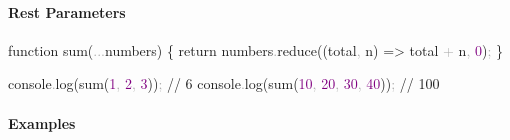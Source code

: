 \documentclass[
  justified,
  openright,
]{tufte-book}
\let\subsubsection\paragraph
\let\paragraph\paragraph
\newcommand{\BuiltInTok}[1]{#1}
\newcommand{\CommentTok}[1]{\textcolor{MidGray}{#1}}
\newcommand{\ControlFlowTok}[1]{\textcolor{BrandBlue}{#1}}
\newcommand{\DecValTok}[1]{\textcolor{Purple}{#1}}
\newcommand{\FunctionTok}[1]{\textcolor{BrandBlue}{#1}}
\newcommand{\KeywordTok}[1]{\textcolor{BrandBlue}{#1}}
\newcommand{\NormalTok}[1]{#1}
\newcommand{\OperatorTok}[1]{\textcolor{DarkGray}{#1}}
\newcommand{\SpecialCharTok}[1]{\textcolor{Teal}{#1}}
\newcommand{\StringTok}[1]{\textcolor{Teal}{#1}}
\newcommand{\VerbatimStringTok}[1]{\textcolor{Teal}{#1}}
\newenvironment{Shaded}{%
  \begin{snugshade}
}{%
  \end{snugshade}
}
\let\subsubsection\paragraph
\let\paragraph\paragraph
\begin{document}
\begin{Shaded}
\end{Shaded}

\subsubsection{Rest Parameters}\label{rest-parameters}

\begin{Shaded}
\begin{Highlighting}[]
\KeywordTok{function} \FunctionTok{sum}\NormalTok{(}\OperatorTok{...}\NormalTok{numbers) \{}
  \ControlFlowTok{return}\NormalTok{ numbers}\OperatorTok{.}\FunctionTok{reduce}\NormalTok{((total}\OperatorTok{,}\NormalTok{ n) }\KeywordTok{=\textgreater{}}\NormalTok{ total }\OperatorTok{+}\NormalTok{ n}\OperatorTok{,} \DecValTok{0}\NormalTok{)}\OperatorTok{;}
\NormalTok{\}}

\BuiltInTok{console}\OperatorTok{.}\FunctionTok{log}\NormalTok{(}\FunctionTok{sum}\NormalTok{(}\DecValTok{1}\OperatorTok{,} \DecValTok{2}\OperatorTok{,} \DecValTok{3}\NormalTok{))}\OperatorTok{;} \CommentTok{// 6}
\BuiltInTok{console}\OperatorTok{.}\FunctionTok{log}\NormalTok{(}\FunctionTok{sum}\NormalTok{(}\DecValTok{10}\OperatorTok{,} \DecValTok{20}\OperatorTok{,} \DecValTok{30}\OperatorTok{,} \DecValTok{40}\NormalTok{))}\OperatorTok{;} \CommentTok{// 100}
\end{Highlighting}
\end{Shaded}

\subsubsection{Examples}\label{examples-5}
\end{document}
